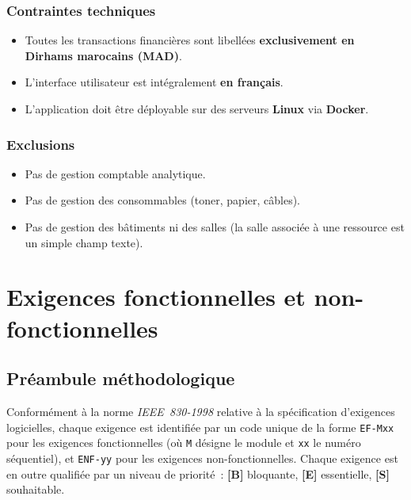 \documentclass[a4paper,11pt,openany]{report}
\newcommand{\mad}{MAD}
\begin{document}
\subsection{Contraintes techniques}
\begin{itemize}
  \item Toutes les transactions financières sont libellées
    \textbf{exclusivement en Dirhams marocains (\mad)}.
  \item L'interface utilisateur est intégralement \textbf{en
    français}.
  \item L'application doit être déployable sur des serveurs
    \textbf{Linux} via \textbf{Docker}.
\end{itemize}

\subsection{Exclusions}
\begin{itemize}
  \item Pas de gestion comptable analytique.
  \item Pas de gestion des consommables (toner, papier, câbles).
  \item Pas de gestion des bâtiments ni des salles (la salle
    associée à une ressource est un simple champ texte).
\end{itemize}

\chapter{Exigences fonctionnelles et non-fonctionnelles}

\section{Préambule méthodologique}

Conformément à la norme \emph{IEEE~830-1998} relative à la
spécification d'exigences logicielles, chaque exigence est
identifiée par un code unique de la forme \texttt{EF-Mxx} pour
les exigences fonctionnelles (où \texttt{M} désigne le module et
\texttt{xx} le numéro séquentiel), et \texttt{ENF-yy} pour les
exigences non-fonctionnelles. Chaque exigence est en outre
qualifiée par un niveau de priorité~: \textbf{[B]} bloquante,
\textbf{[E]} essentielle, \textbf{[S]} souhaitable.
\end{document}
